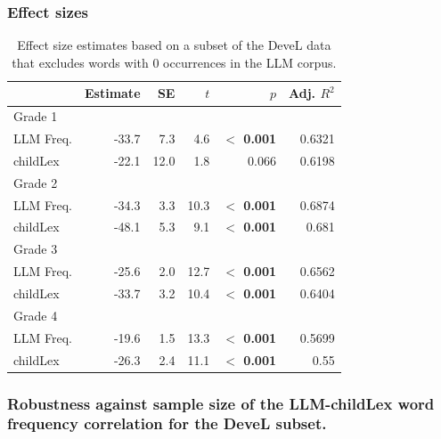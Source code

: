 \documentclass[doc, a4paper]{apa7}
\begin{document}
\clearpage


\subsubsection{Effect sizes}

\begin{table}[!htbp]
\caption{Effect size estimates based on a subset of the DeveL data that excludes words with 0 occurrences in the LLM corpus. }
\centering
\begin{tabular}{lrrrrr}
  \hline
 & Estimate & SE & $t$ & $p$ & Adj. $R^2$   \\ 
  \hline
  Grade 1 \\ 
  LLM Freq. & -33.7 & 7.3 & 4.6 & \textbf{$<$ 0.001} & 0.6321 \\ 
  childLex & -22.1 & 12.0 & 1.8 & 0.066 & 0.6198\\ 
  Grade 2 \\ 
  LLM Freq. & -34.3 & 3.3 & 10.3 & \textbf{$<$ 0.001} & 0.6874 \\ 
  childLex & -48.1 & 5.3 & 9.1 & \textbf{$<$ 0.001} & 0.681 \\ 
    Grade 3 \\ 
  LLM Freq. & -25.6 & 2.0 & 12.7 & \textbf{$<$ 0.001} & 0.6562 \\ 
  childLex & -33.7 & 3.2 & 10.4 & \textbf{$<$ 0.001} & 0.6404 \\ 
      Grade 4 \\ 
  LLM Freq. & -19.6 & 1.5 & 13.3 & \textbf{$<$ 0.001} & 0.5699 \\ 
  childLex & -26.3 & 2.4 & 11.1 & \textbf{$<$ 0.001} & 0.55 \\ 
  \hline
\end{tabular}
\end{table}

\clearpage


\subsubsection{Robustness against sample size of the LLM-childLex word frequency correlation for the DeveL subset. }
\end{document}
